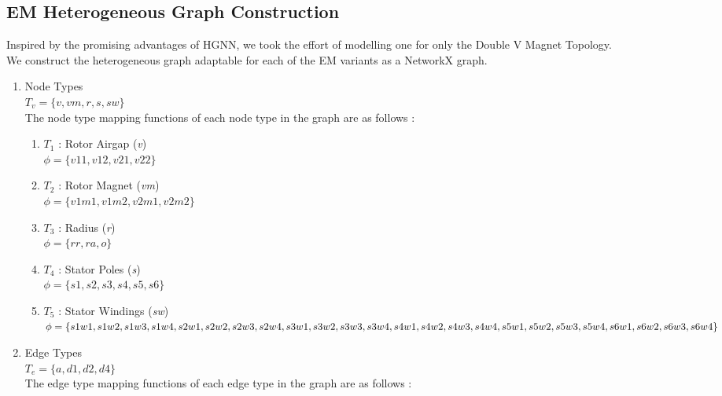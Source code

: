 \documentclass{report} %
\begin{document}
\subsection{\ac{EM} Heterogeneous Graph Construction}\label{subsec:EM Heterogeneous Graph Construction}
Inspired by the promising advantages of HGNN, we took the effort of modelling one for only the Double V Magnet Topology.\\
We construct the heterogeneous graph adaptable for each of the \ac{EM} variants as a NetworkX graph.
\begin{enumerate}
    \item Node Types \\
    \( T_v = \{ v, vm, r, s, sw\} \) \\
    The node type mapping functions of each node type in the graph are as follows :
    \begin{enumerate}
        \item \( T_1\) : Rotor Airgap (\textit{v})  \\
        \( \phi = \{ v11, v12, v21, v22\} \)
        \item \( T_2\) : Rotor Magnet (\textit{vm})  \\
        \( \phi = \{ v1m1, v1m2, v2m1, v2m2\} \)
        \item \( T_3\) : Radius (\textit{r})  \\
        \( \phi = \{ rr, ra, o\} \)
        \item \( T_4\) : Stator Poles (\textit{s})  \\
        \( \phi = \{ s1, s2, s3, s4, s5, s6\} \)
        \item \( T_5\) : Stator Windings (\textit{sw})  \\
        \( \phi = \{ s1w1, s1w2, s1w3, s1w4, \\
                     s2w1, s2w2, s2w3, s2w4, \\
                     s3w1, s3w2, s3w3, s3w4, \\
                     s4w1, s4w2, s4w3, s4w4, \\
                     s5w1, s5w2, s5w3, s5w4, \\
                     s6w1, s6w2, s6w3, s6w4\} \)
    \end{enumerate}
    \item Edge Types \\
    \( T_e = \{ a, d1, d2, d4\} \)\\
    The edge type mapping functions of each edge type in the graph are as follows : \\

\end{enumerate}
\end{document}

